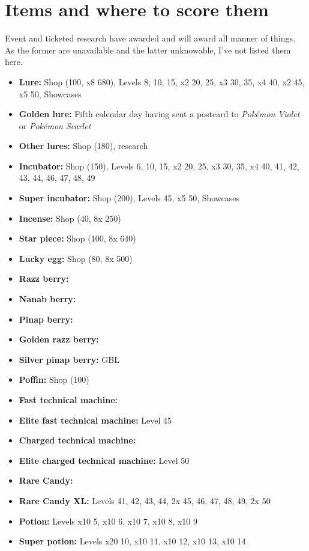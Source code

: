 \section{Items and where to score them\label{sec:items}}
Event and ticketed research have awarded and will award all manner of things.
As the former are unavailable and the latter unknowable, I've not listed them here.
\begin{itemize}
\item \textbf{Lure:} Shop (100\coin, x8 680\coin), Levels 8, 10, 15, x2 20, 25, x3 30, 35, x4 40, x2 45, x5 50, Showcases
\item \textbf{Golden lure:} Fifth calendar day having sent a postcard to \textit{Pokémon Violet} or \textit{Pokémon Scarlet}
\item \textbf{Other lures:} Shop (180\coin), research
\item \textbf{Incubator:} Shop (150\coin), Levels 6, 10, 15, x2 20, 25, x3 30, 35, x4 40, 41, 42, 43, 44, 46, 47, 48, 49
\item \textbf{Super incubator:} Shop (200\coin), Levels 45, x5 50, Showcases
\item \textbf{Incense:} Shop (40\coin, 8x 250\coin)
\item \textbf{Star piece:} Shop (100\coin, 8x 640\coin)
\item \textbf{Lucky egg:} Shop (80\coin, 8x 500\coin)
\item \textbf{Razz berry:}
\item \textbf{Nanab berry:}
\item \textbf{Pinap berry:}
\item \textbf{Golden razz berry:}
\item \textbf{Silver pinap berry:} GBL
\item \textbf{Poffin:} Shop (100\coin)
\item \textbf{Fast technical machine:}
\item \textbf{Elite fast technical machine:} Level 45
\item \textbf{Charged technical machine:}
\item \textbf{Elite charged technical machine:} Level 50
\item \textbf{Rare Candy:}
\item \textbf{Rare Candy XL:} Levels 41, 42, 43, 44, 2x 45, 46, 47, 48, 49, 2x 50
\item \textbf{Potion:} Levels x10 5, x10 6, x10 7, x10 8, x10 9
\item \textbf{Super potion:} Levels x20 10, x10 11, x10 12, x10 13, x10 14

\end{itemize}
